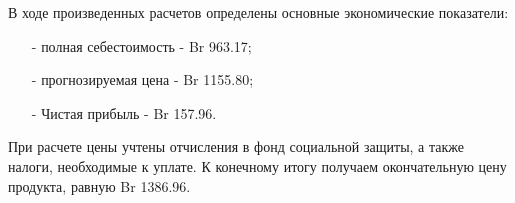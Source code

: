 В ходе произведенных расчетов определены основные экономические показатели:
\begin{enumerate}
    \item[-] полная себестоимость - Br 963.17;
    \item[-] прогнозируемая цена - Br 1155.80;
    \item[-] Чистая прибыль - Br 157.96.
\end{enumerate}

При расчете цены учтены отчисления в фонд социальной защиты, а также налоги, необходимые к уплате.
К конечному итогу получаем окончательную цену продукта, равную Br 1386.96. 
